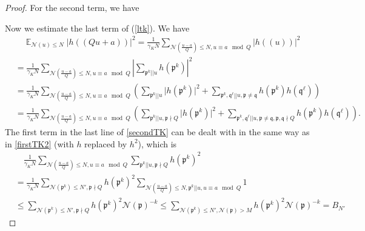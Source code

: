 \documentclass[11pt]{amsart}
\theoremstyle{definition}
\DeclareMathOperator*{\E}{\mathbb{E}}
\newcommand{\NN}{{\mathcal N}}
\newcommand{\mf}{\mathfrak}
\begin{document}
\begin{proof}
For the second term, we have

\fi

Now we estimate the last term of (\ref{ltk}). We have
\begin{equation}\label{secondTK}
    \begin{split}
        &\quad \E_{\NN(u) \leq N}\vert h((Qu+a))\vert^{2}
        =\frac{1}{\gamma_{K} N}\sum_{\NN(\frac{u-a}{Q})\leq N, u\equiv a \mod Q}\vert h((u))\vert^{2}
        \\&=\frac{1}{\gamma_{K} N}\sum_{\NN(\frac{u-a}{Q})\leq N, u\equiv a \mod Q}\left| \sum_{\mf p^{k}|| u} h(\mf p^{k})\right|^{2}
        \\&=\frac{1}{\gamma_{K} N}\sum_{\NN(\frac{u-a}{Q})\leq N, u\equiv a \mod Q}\left(\sum_{\mf p^{k}|| u} \vert h(\mf p^{k})\vert^{2}+\sum_{\mf p^{k},\mf q^{\ell}|| u, \mf p\neq \mf q} h(\mf p^{k})h(\mf q^{\ell})\right)
          \\&=\frac{1}{\gamma_{K} N}\sum_{\NN(\frac{u-a}{Q})\leq N, u\equiv a \mod Q}\left(\sum_{\mf p^{k}|| u, \mf p\nmid Q} \vert h(\mf p^{k})\vert^{2}+\sum_{\mf p^{k},\mf q^{\ell}|| u, \mf p\neq \mf q, \mf p,\mf q\nmid Q} h(\mf p^{k})h(\mf q^{\ell})\right).
    \end{split}
\end{equation}
The first term in the last line of \eqref{secondTK} can be dealt with in the same way as in  \eqref{firstTK2} %
(with $h$ replaced by $h^{2}$), which is  
\begin{equation}\label{secondTK2}
    \begin{split}
        &\quad 
        \frac{1}{\gamma_{K} N}\sum_{\NN(\frac{u-a}{Q})\leq N, u\equiv a \mod Q}\sum_{\mf p^{k}|| u, \mf p\nmid Q} h(\mf p^{k})^{2}
     \\&=\frac{1}{\gamma_{K} N}\sum_{\NN(\mf p^{k})\leq N', \mf p\nmid Q}h(\mf p^{k})^{2}\sum_{\NN(\frac{u-a}{Q})\leq N, \mf p^{k}||u, u\equiv a \mod Q} 1
      \\&\leq\sum_{\NN(\mf p^{k})\leq N', \mf p\nmid Q}h(\mf p^{k})^{2}\NN(\mf p)^{-k}
 \leq\sum_{\NN(\mf p^{k})\leq N', \NN(\mf p)>M}h(\mf p^{k})^{2}\NN(\mf p)^{-k}=B_{N'}
    \end{split}

\end{equation}
\end{proof}
\end{document}

